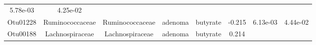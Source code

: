 \documentclass[11pt,]{article}
\begin{document}
\begin{longtable}[]{@{}cccccccc@{}}
\begin{minipage}[t]{0.08\columnwidth}
5.78e-03\strut
\end{minipage} & \begin{minipage}[t]{0.08\columnwidth}\centering\strut
4.25e-02\strut
\end{minipage}\tabularnewline
\begin{minipage}[t]{0.08\columnwidth}\centering\strut
Otu01228\strut
\end{minipage} & \begin{minipage}[t]{0.15\columnwidth}\centering\strut
Ruminococcaceae\strut
\end{minipage} & \begin{minipage}[t]{0.15\columnwidth}\centering\strut
Ruminococcaceae\strut
\end{minipage} & \begin{minipage}[t]{0.08\columnwidth}\centering\strut
adenoma\strut
\end{minipage} & \begin{minipage}[t]{0.09\columnwidth}\centering\strut
butyrate\strut
\end{minipage} & \begin{minipage}[t]{0.07\columnwidth}\centering\strut
-0.215\strut
\end{minipage} & \begin{minipage}[t]{0.08\columnwidth}\centering\strut
6.13e-03\strut
\end{minipage} & \begin{minipage}[t]{0.08\columnwidth}\centering\strut
4.44e-02\strut
\end{minipage}\tabularnewline
\begin{minipage}[t]{0.08\columnwidth}\centering\strut
Otu00188\strut
\end{minipage} & \begin{minipage}[t]{0.15\columnwidth}\centering\strut
Lachnospiraceae\strut
\end{minipage} & \begin{minipage}[t]{0.15\columnwidth}\centering\strut
Lachnospiraceae\strut
\end{minipage} & \begin{minipage}[t]{0.08\columnwidth}\centering\strut
adenoma\strut
\end{minipage} & \begin{minipage}[t]{0.09\columnwidth}\centering\strut
butyrate\strut
\end{minipage} & \begin{minipage}[t]{0.07\columnwidth}\centering\strut
0.214\strut
\end{minipage} & \begin{minipage}[t]{0.08\columnwidth}\centering\strut

\end{minipage}
\end{longtable}
\end{document}
